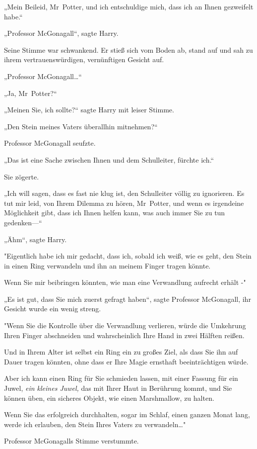 {„Mein Beileid, Mr~Potter, und ich entschuldige mich, dass ich an Ihnen gezweifelt habe.“

„Professor McGonagall“, sagte Harry.

Seine Stimme war schwankend. Er stieß sich vom Boden ab, stand auf und sah zu ihrem vertrauenswürdigen, vernünftigen Gesicht auf.

„Professor McGonagall…“

„Ja, Mr~Potter?“

„Meinen Sie, ich sollte?“ sagte Harry mit leiser Stimme.

„Den Stein meines Vaters überallhin mitnehmen?“

Professor McGonagall seufzte.

„Das ist eine Sache zwischen Ihnen und dem Schulleiter, fürchte ich.“

Sie zögerte.

„Ich will sagen, dass es fast nie klug ist, den Schulleiter völlig zu ignorieren. Es tut mir leid, von Ihrem Dilemma zu hören, Mr~Potter, und wenn es irgendeine Möglichkeit gibt, dass ich Ihnen helfen kann, was auch immer Sie zu tun gedenken—“

„Ähm“, sagte Harry.

"Eigentlich habe ich mir gedacht, dass ich, sobald ich weiß, wie es geht, den Stein in einen Ring verwandeln und ihn an meinem Finger tragen könnte.

Wenn Sie mir beibringen könnten, wie man eine Verwandlung aufrecht erhält -"

„Es ist gut, dass Sie mich zuerst gefragt haben“, sagte Professor McGonagall, ihr Gesicht wurde ein wenig streng.

"Wenn Sie die Kontrolle über die Verwandlung verlieren, würde die Umkehrung Ihren Finger abschneiden und wahrscheinlich Ihre Hand in zwei Hälften reißen.

Und in Ihrem Alter ist selbst ein Ring ein zu großes Ziel, als dass Sie ihn auf Dauer tragen könnten, ohne dass er Ihre Magie ernsthaft beeinträchtigen würde.

Aber ich kann einen Ring für Sie schmieden lassen, mit einer Fassung für ein Juwel, \emph{ein kleines Juwel,} das mit Ihrer Haut in Berührung kommt, und Sie können üben, ein sicheres Objekt, wie einen Marshmallow, zu halten.

Wenn Sie das erfolgreich durchhalten, sogar im Schlaf, einen ganzen Monat lang, werde ich erlauben, den Stein Ihres Vaters zu verwandeln…"

Professor McGonagalls Stimme verstummte.

}
